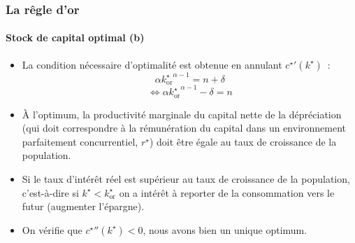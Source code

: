 \documentclass[10pt,notheorems]{beamer}
\theoremstyle{plain}
\theoremstyle{definition} %
\begin{document}
\begin{frame}
  \frametitle{La rêgle d'or}
  \framesubtitle{Stock de capital optimal (b)}

  \bigskip

  \begin{itemize}

  \item La condition nécessaire d'optimalité est obtenue en annulant $\left.c^{\star}\right.'(k^{\star})$~:
    \[
      \alpha \left. k_{\textrm{or}}^{\star}\right. ^{\alpha-1} = n+\delta
    \]
    \[
      \Leftrightarrow \alpha \left. k_{\textrm{or}}^{\star}\right. ^{\alpha-1}-\delta = n
    \]

    \bigskip

  \item À l'optimum, la productivité marginale du capital nette de la dépréciation (qui doit correspondre à la rémunération du capital dans un environnement parfaitement concurrentiel, $r^{\star}$) doit être égale au taux de croissance de la population.\newline

  \item Si le taux d'intérêt réel est supérieur au taux de croissance de la population, c'est-à-dire si $k^{\star}<k_{\textrm{or}}^{\star}$ on a intérêt à reporter de la consommation vers le futur (augmenter l'épargne).\newline

  \item On vérifie que $\left.c^{\star}\right.''(k^{\star})<0$, nous avons bien un unique optimum.

  \end{itemize}

\end{frame}
\end{document}

